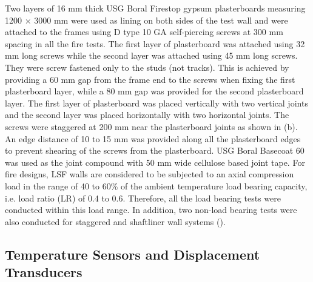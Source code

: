 Two layers of 16 mm thick USG Boral Firestop gypsum plasterboards measuring 1200 \(\times\) 3000 mm were used as lining on both sides of the test wall and were attached to the frames using D type 10 GA self-piercing screws at 300 mm spacing in all the fire tests. The first layer of plasterboard was attached using 32 mm long screws while the second layer was attached using 45 mm long screws. They were screw fastened only to the studs (not tracks). This is achieved by providing a 60 mm gap from the frame end to the screws when fixing the first plasterboard layer, while a 80 mm gap was provided for the second plasterboard layer. The first layer of plasterboard was placed vertically with two vertical joints and the second layer was placed horizontally with two horizontal joints. The screws were staggered at 200 mm near the plasterboard joints as shown in  (b). An edge distance of 10 to 15 mm was provided along all the plasterboard edges to prevent shearing of the screws from the plasterboard. USG Boral Basecoat 60 was used as the joint compound with 50 mm wide cellulose based joint tape. For fire designs, LSF walls are considered to be subjected to an axial compression load in the range of 40 to 60\% of the ambient temperature load bearing capacity, i.e. load ratio (LR) of 0.4 to 0.6. Therefore, all the load bearing tests were conducted within this load range. In addition, two non-load bearing tests were also conducted for staggered and shaftliner wall systems ().

\subsection{Temperature Sensors and Displacement Transducers}

